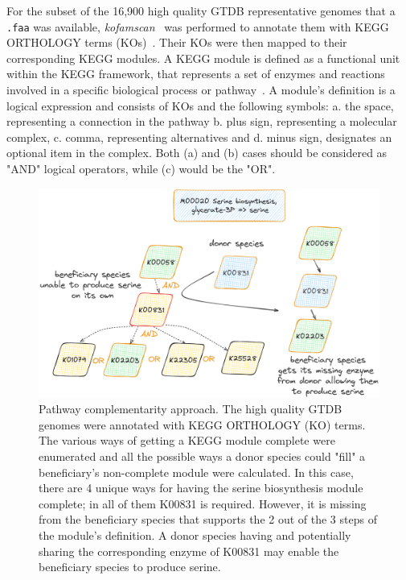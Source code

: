 \documentclass[sn-mathphys,Numbered]{sn-jnl}%
\theoremstyle{thmstyleone}%
\theoremstyle{thmstyletwo}%
\theoremstyle{thmstylethree}%
\begin{document}
        For the subset of the 16,900 high quality GTDB representative genomes that a \texttt{.faa} was available, 
        \textit{kofamscan}~\cite{aramaki2020kofamkoala} was performed to annotate them with KEGG ORTHOLOGY terms (KOs)~\cite{kanehisa2012kegg}. 
        Their KOs were then mapped to their corresponding KEGG modules. 
        A KEGG module is defined as a functional unit within the KEGG framework, that represents a set of enzymes and reactions involved in a specific biological process or pathway~\cite{muto2013modular}.
        A module's definition is a logical expression and consists of KOs and the following symbols:
        a. the space, representing a connection in the pathway
        b. plus sign, representing a molecular complex,  
        c. comma, representing alternatives and
        d. minus sign, designates an optional item in the complex.
        Both (a) and (b) cases should be considered as "AND" logical operators, while (c) would be the "OR".



        \begin{figure}[h!]
            \label{fig:path-compl}
            \includegraphics*[width=0.8\columnwidth]{figs/path_complem.png}
            \caption{
                Pathway complementarity approach. 
                The high quality GTDB genomes were annotated with KEGG ORTHOLOGY (KO) terms.
                The various ways of getting a KEGG module complete were enumerated and all the possible ways a donor species
                could "fill" a beneficiary's non-complete module were calculated. 
                In this case, there are 4 unique ways for having the serine biosynthesis module complete; in all of them K00831 is required. 
                However, it is missing from the beneficiary species that supports the 2 out of the 3 steps of the module's definition.
                A donor species having and potentially sharing the corresponding enzyme of K00831 may enable the beneficiary species to 
                produce serine.
            }
        \end{figure}
\end{document}
